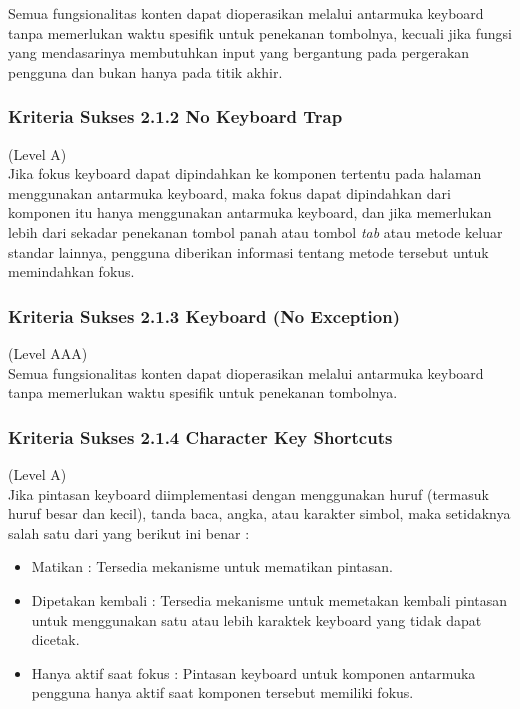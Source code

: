 \documentclass[a4paper,twoside]{article}
\begin{document}
\begin{enumerate}
		Semua fungsionalitas konten dapat dioperasikan melalui antarmuka keyboard tanpa memerlukan waktu spesifik untuk penekanan tombolnya, kecuali jika fungsi yang mendasarinya membutuhkan input yang bergantung pada pergerakan pengguna dan bukan hanya pada titik akhir.
		
		\subsubsection*{Kriteria Sukses 2.1.2 No Keyboard Trap}
		\label{subsubsec:kriteria_2.1.2}
		(Level A) \\
		
		Jika fokus keyboard dapat dipindahkan ke komponen tertentu pada halaman menggunakan antarmuka keyboard, maka fokus dapat dipindahkan dari komponen itu hanya menggunakan antarmuka keyboard, dan jika memerlukan lebih dari sekadar penekanan tombol panah atau tombol \textit{tab} atau metode keluar standar lainnya, pengguna diberikan informasi tentang metode tersebut untuk memindahkan fokus.
		
		\subsubsection*{Kriteria Sukses 2.1.3 Keyboard (No Exception)}
		\label{subsubsec:kriteria_2.1.3}
		(Level AAA) \\
		Semua fungsionalitas konten dapat dioperasikan melalui antarmuka keyboard tanpa memerlukan waktu spesifik untuk penekanan tombolnya.
		
		\subsubsection*{Kriteria Sukses 2.1.4 Character Key Shortcuts}
		\label{subsubsec:kriteria_2.1.4}
		(Level A) \\
		
		Jika pintasan keyboard diimplementasi dengan menggunakan huruf (termasuk huruf besar dan kecil), tanda baca, angka, atau karakter simbol, maka setidaknya salah satu dari yang berikut ini benar :
		
		\begin{itemize}
			\item Matikan : Tersedia mekanisme untuk mematikan pintasan.
			\item Dipetakan kembali : Tersedia mekanisme untuk memetakan kembali pintasan untuk menggunakan satu atau lebih karaktek keyboard yang tidak dapat dicetak.
			\item Hanya aktif saat fokus : Pintasan keyboard untuk komponen antarmuka pengguna hanya aktif saat komponen tersebut memiliki fokus.
		\end{itemize}
		

\end{enumerate}
\end{document}
